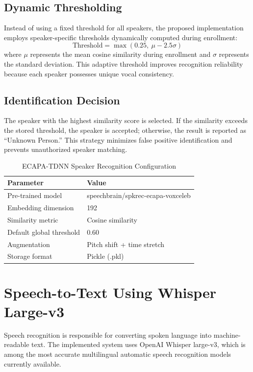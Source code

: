 \documentclass[12pt]{report}
\begin{document}
\subsection{Dynamic Thresholding}

Instead of using a fixed threshold for all speakers, the proposed implementation employs speaker-specific thresholds dynamically computed during enrollment:
\[
\text{Threshold} = \max(0.25,\ \mu - 2.5\sigma)
\]
where $\mu$ represents the mean cosine similarity during enrollment and $\sigma$ represents the standard deviation. This adaptive threshold improves recognition reliability because each speaker possesses unique vocal consistency.

\subsection{Identification Decision}

The speaker with the highest similarity score is selected. If the similarity exceeds the stored threshold, the speaker is accepted; otherwise, the result is reported as ``Unknown Person.'' This strategy minimizes false positive identification and prevents unauthorized speaker matching.

\begin{table}[H]
\centering
\begin{tabular}{|l|l|}
\hline
\textbf{Parameter} & \textbf{Value} \\
\hline
Pre-trained model & speechbrain/spkrec-ecapa-voxceleb \\
\hline
Embedding dimension & 192 \\
\hline
Similarity metric & Cosine similarity \\
\hline
Default global threshold & 0.60 \\
\hline
Augmentation & Pitch shift + time stretch \\
\hline
Storage format & Pickle (.pkl) \\
\hline
\end{tabular}
\caption{ECAPA-TDNN Speaker Recognition Configuration}
\end{table}

\section{Speech-to-Text Using Whisper Large-v3}

Speech recognition is responsible for converting spoken language into machine-readable text. The implemented system uses OpenAI Whisper large-v3, which is among the most accurate multilingual automatic speech recognition models currently available.
\end{document}
